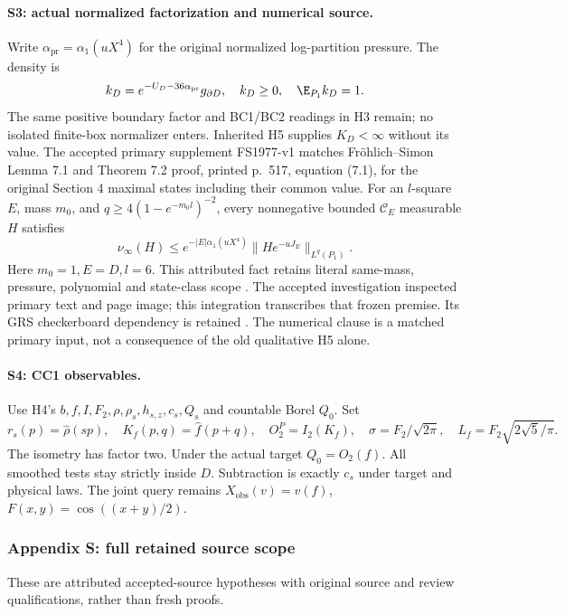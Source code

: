 \paragraph{S3: actual normalized factorization and numerical source.}
Write $\alpha_{\mathrm{pr}}=\alpha_1(uX^4)$ for the original normalized
log-partition pressure. The density is
\[
 k_D=e^{-U_D-36\alpha_{\mathrm{pr}}}g_{\partial D},\quad
 k_D\ge0,\quad\E_{P_1}k_D=1.
\]
The same positive boundary factor and BC1/BC2 readings in H3 remain;
no isolated finite-box normalizer enters. Inherited H5 supplies $K_D<\infty$
without its value. The accepted primary supplement FS1977-v1 matches
Fr\"ohlich--Simon Lemma 7.1 and Theorem 7.2 proof, printed p.~517,
equation (7.1), for the original Section 4 maximal states including their
common value. For an $l$-square $E$, mass $m_0$, and
$q\ge4(1-e^{-m_0l})^{-2}$, every nonnegative bounded $\mathcal C_E$
measurable $H$ satisfies
\[
 \nu_\infty(H)\le e^{-|E|\alpha_1(uX^4)}
                    \|He^{-uJ_E}\|_{L^q(P_1)}.
\]
Here $m_0=1,E=D,l=6$. This attributed fact retains literal same-mass,
pressure, polynomial and state-class scope
\citep[Lemma 7.1 and proof of Theorem 7.2, p.~517]{FS1977}.
The accepted investigation inspected primary text and page image; this
integration transcribes that frozen premise. Its GRS checkerboard
dependency is retained \citep{GRS1976}. The numerical clause is a matched
primary input, not a consequence of the old qualitative H5 alone.

\paragraph{S4: CC1 observables.}
Use H4's $b,f,I,F_2,\rho,\rho_s,h_{s,z},c_s,Q_s$ and countable Borel
$Q_0$. Set
\[
 r_s(p)=\hat\rho(sp),\quad K_f(p,q)=\hat f(p+q),\quad
 O_2^P=I_2(K_f),\quad \sigma=F_2/\sqrt{2\pi},\quad L_f=F_2\sqrt{2\sqrt5/\pi}.
\]
The isometry has factor two. Under the actual target $Q_0=O_2(f)$.
All smoothed tests stay strictly inside $D$. Subtraction is exactly $c_s$
under target and physical laws. The joint query remains
$X_{\mathrm{obs}}(v)=v(f)$, $F(x,y)=\cos((x+y)/2)$.

\subsubsection*{Appendix S: full retained source scope}
These are attributed accepted-source hypotheses with original source and
review qualifications, rather than fresh proofs.

